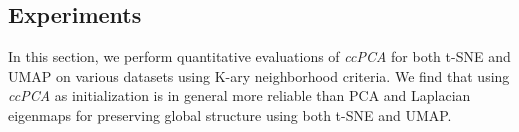 \subsection{Experiments}\label{sec:ccPCA}



In this section, we perform quantitative evaluations of \textit{ccPCA} for both t-SNE and UMAP on various datasets using K-ary neighborhood criteria. 
We find that using \textit{ccPCA} as initialization is in general more reliable than PCA and Laplacian eigenmaps for preserving global structure using both t-SNE and UMAP. 

